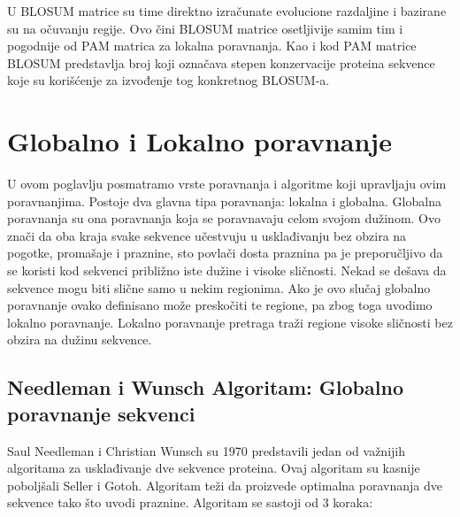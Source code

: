 U BLOSUM matrice su time direktno izračunate evolucione razdaljine i bazirane su na očuvanju regije. Ovo čini BLOSUM matrice osetljivije samim tim i pogodnije od PAM matrica za lokalna poravnanja. Kao i kod PAM matrice BLOSUM predstavlja broj koji označava stepen konzervacije proteina sekvence koje su korišćenje za izvođenje tog konkretnog BLOSUM-a.


\section{Globalno i Lokalno poravnanje}
U ovom poglavlju posmatramo vrste poravnanja i algoritme koji upravljaju ovim poravnanjima. Postoje dva glavna tipa poravnanja: lokalna i globalna. Globalna poravnanja su ona poravnanja koja se poravnavaju celom svojom dužinom. Ovo znači da oba kraja svake sekvence učestvuju u usklađivanju bez obzira na pogotke, promašaje i praznine, sto povlači dosta praznina pa je preporučljivo da se koristi kod sekvenci približno iste dužine i visoke sličnosti. Nekad se dešava da sekvence mogu biti slične samo u nekim regionima. Ako je ovo slučaj globalno poravnanje ovako definisano može preskočiti te regione, pa zbog toga uvodimo lokalno poravnanje. Lokalno poravnanje pretraga traži regione visoke sličnosti bez obzira na dužinu sekvence.


\subsection{Needleman i Wunsch Algoritam: Globalno poravnanje sekvenci}
Saul Needleman i Christian Wunsch su 1970 predstavili jedan od važnijih algoritama za usklađivanje dve sekvence proteina. Ovaj algoritam su kasnije poboljšali Seller i Gotoh. Algoritam teži da proizvede optimalna poravnanja dve sekvence tako što uvodi praznine. Algoritam se sastoji od 3 koraka: 

